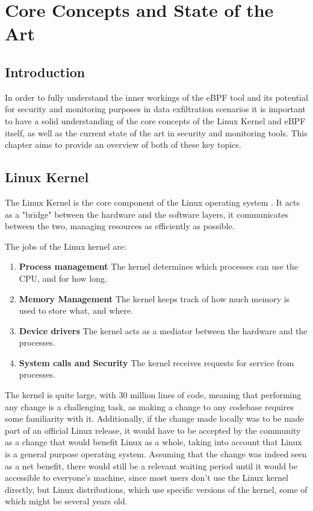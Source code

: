 \chapter{Core Concepts and State of the Art}

\section{Introduction}

In order to fully understand the inner workings of the eBPF tool and its potential for security and monitoring purposes in data exfiltration scenarios it is important to have a solid understanding of the core concepts of the Linux Kernel and eBPF itself, as well as the current state of the art in security and monitoring tools.
This chapter aims to provide an overview of both of these key topics.



\section{Linux Kernel}
The Linux Kernel is the core component of the Linux operating system \cite{kernel}. It acts as a "bridge" between the hardware and the software layers, it communicates between the two, managing resources as efficiently as possible.

The jobs of the Linux kernel are:
\begin{enumerate}
	\item \textbf{Process management}
	      The kernel determines which processes can use the CPU, and for how long.
	\item \textbf{Memory Management}
	      The kernel keeps track of how much memory is used to store what, and where.
	\item \textbf{Device drivers}
	      The kernel acts as a mediator between the hardware and the processes.
	\item \textbf{System calls and Security}
	      The kernel receives requests for service from processes.
\end{enumerate}


The kernel is quite large, with 30 million lines of code, meaning that performing any change is a challenging task, as making a change to any codebase requires some familiarity with it. Additionally, if the change made locally was to be made part of an official Linux release, it would have to be accepted by the community as a change that would benefit Linux as a whole, taking into account that Linux is a general purpose operating system. Assuming that the change was indeed seen as a net benefit, there would still be a relevant waiting period until it would be accessible to everyone's machine, since most users don't use the Linux kernel directly, but Linux distributions, which use specific versions of the kernel, some of which might be several years old.


